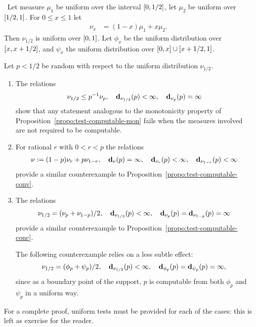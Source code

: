   \begin{example}\label{example:monotonicity-counter}\
 Let measure \( \mu_{1} \) be uniform over the interval \( [0,1/2] \), 
let \( \mu_{2} \) be uniform over \( [1/2,1] \).
For \( 0\le x \le 1 \) let
 \begin{align*}
      \nu_{x} &= (1-x)\mu_{1} + x\mu_{2}.
  \end{align*}
Then \( \nu_{1/2} \) is uniform over \( [0,1] \).
Let \( \phi_{x} \) be the uniform distribution over \( [x,x+1/2] \),
and \( \psi_{x} \) the uniform distribution over
\( [0,x]\cup[x+1/2,1] \).

Let \( p<1/2 \) be random with respect to the uniform
distribution \( \nu_{1/2} \).

 \begin{enumerate}
  \item The relations
 \begin{align*}
  \nu_{1/2}\le p^{-1}\nu_{p},
  \quad \mathbf{d}_{\nu_{1/2}}(p)<\infty,\quad\mathbf{d}_{\nu_{p}}(p)=\infty
 \end{align*} 
show that any statement analogous to the monotonicity property of
Proposition~\ref{propo:test-computable-mon}
fails when the measures involved are not required to be computable.

  \item
For rational \( r \) with \( 0<r<p \) the relations
\begin{align*}
   \nu:=(1-p)\nu_{r} + p\nu_{1-r},
\quad \mathbf{d}_{\nu}(p)=\infty,
\quad\mathbf{d}_{\nu_{r}}(p)<\infty,
\quad \mathbf{d}_{\nu_{1-r}}(p)<\infty 
 \end{align*}
provide a similar counterexample to Proposition~\ref{propo:test-computable-conv}.

  \item
The relations
 \begin{align*}
 \nu_{1/2} = (\nu_{p}+\nu_{1-p})/2, 
 \quad \mathbf{d}_{\nu_{1/2}}(p)<\infty,\quad \mathbf{d}_{\nu_{p}}(p)=\mathbf{d}_{\nu_{1-p}}(p)=\infty
 \end{align*}
provide a similar counterexample to Proposition~\ref{propo:test-computable-conc}.

The following counterexample relies on a less subtle effect:
 \begin{align*}
\nu_{1/2}=(\phi_{p}+\psi_{p})/2,
\quad\mathbf{d}_{\nu_{1/2}}(p)<\infty,
\quad\mathbf{d}_{\phi_{p}}(p)=\mathbf{d}_{\psi_{p}}(p)=\infty,
 \end{align*}
since
as a boundary point of the support, \( p \) is computable from both \( \phi_{p} \) and
\( \psi_{p} \) in a uniform way.
 \end{enumerate}
For a complete proof, uniform tests must be provided for each of the cases: this
is left as exercise for the reader.
  \end{example}


